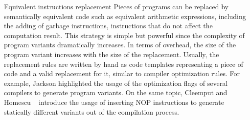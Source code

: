



\begin{strategy}{Equivalent instructions replacement}
    \label{strategy:S1}
    \normalfont 
    Pieces of programs can be replaced by semantically equivalent code such as equivalent arithmetic expressions, including the adding of garbage instructions, \ie instructions that do not affect the computation result. This strategy is simple but powerful since the complexity of program variants dramatically increases. In terms of overhead, the size of the program variant increases with the size of the replacement. Usually, the replacement rules are written by hand as code templates representing a piece of code and a valid replacement for it, similar to compiler optimization rules. For example, Jackson \etal \cite{jackson2011compiler} highlighted the usage of  the optimization flags of several compilers to generate program variants. On the same topic, Cleemput \etal \cite{Cleemput2012} and Homescu \etal~\cite{homescu2013profile} introduce the usage of inserting NOP instructions to generate statically different variants out of the compilation process. 



\end{strategy}
